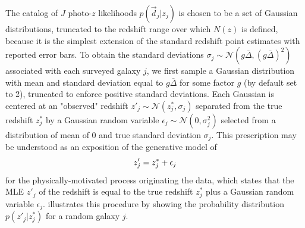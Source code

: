 The catalog of $J$ photo-$z$ likelihoods $p(\vec{d}_{j}|z_{j})$ is chosen to be a set of Gaussian distributions, truncated to the redshift range over which $N(z)$ is defined, because it is the simplest extension of the standard redshift point estimates with reported error bars.  
To obtain the standard deviations $\sigma_{j}\sim\mathcal{N}(g\bar{\Delta},(g\bar{\Delta})^{2})$ associated with each surveyed galaxy $j$, we first sample a Gaussian 
distribution with mean and standard deviation equal to $g\bar{\Delta}$ for some factor $g$ (by default set to 2), truncated to enforce positive standard deviations.  
Each Gaussian is centered at an "observed" redshift $z'_{j}\sim\mathcal{N}(z^{*}_{j},\sigma_{j})$ separated from the true redshift $z^{*}_{j}$ by a Gaussian random variable $\epsilon_{j}\sim\mathcal{N}(0,\sigma^{2}_{j})$ selected from a distribution of mean of 0 and true standard deviation $\sigma_{j}$.   
This prescription may be understood as an exposition of the generative model of 
\begin{equation}
\eqlabel{eq:genmod}
z'_{j} = z^{*}_{j}+\epsilon_{j}
\end{equation}
for the physically-motivated process originating the data, which states that the MLE $z'_{j}$ of the redshift is equal to the true redshift $z^{*}_{j}$ plus a Gaussian random variable $\epsilon_{j}$.  
 illustrates this procedure by showing the probability distribution $p(z'_{j}|z^{*}_{j})$ for a random galaxy $j$.

